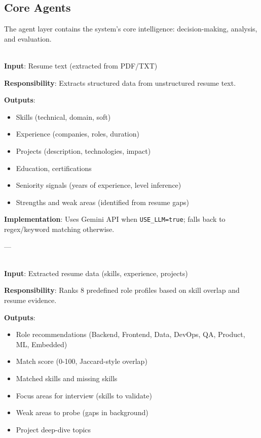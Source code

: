 \documentclass[11pt]{article}
\begin{document}
\newpage

\subsection{Core Agents}

The agent layer contains the system's core intelligence: decision-making, analysis, and evaluation.

\begin{description}[leftmargin=3cm, style=nextline]

  \item[\textbf{resume\_agent}]
  \hfill \\
  \textbf{Input}: Resume text (extracted from PDF/TXT)

  \textbf{Responsibility}: Extracts structured data from unstructured resume text.

  \textbf{Outputs}:
  \begin{itemize}
    \item Skills (technical, domain, soft)
    \item Experience (companies, roles, duration)
    \item Projects (description, technologies, impact)
    \item Education, certifications
    \item Seniority signals (years of experience, level inference)
    \item Strengths and weak areas (identified from resume gaps)
  \end{itemize}

  \textbf{Implementation}: Uses Gemini API when \texttt{USE\_LLM=true}; falls back to regex/keyword matching otherwise.

  ---

  \item[\textbf{role\_agent}]
  \hfill \\
  \textbf{Input}: Extracted resume data (skills, experience, projects)

  \textbf{Responsibility}: Ranks 8 predefined role profiles based on skill overlap and resume evidence.

  \textbf{Outputs}:
  \begin{itemize}
    \item Role recommendations (Backend, Frontend, Data, DevOps, QA, Product, ML, Embedded)
    \item Match score (0-100, Jaccard-style overlap)
    \item Matched skills and missing skills
    \item Focus areas for interview (skills to validate)
    \item Weak areas to probe (gaps in background)
    \item Project deep-dive topics
  \end{itemize}


\end{description}
\end{document}
